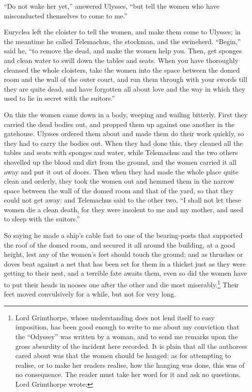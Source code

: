 “Do not wake her yet,” answered Ulysses, “but tell the women who have
misconducted themselves to come to me.”

Euryclea left the cloister to tell the women, and make them come to Ulysses; in
the meantime he called Telemachus, the stockman, and the swineherd. “Begin,”
said he, “to remove the dead, and make the women help you. Then, get sponges
and clean water to swill down the tables and seats. When you have thoroughly
cleansed the whole cloisters, take the women into the space between the domed
room and the wall of the outer court, and run them through with your swords
till they are quite dead, and have forgotten all about love and the way in
which they used to lie in secret with the suitors.”

On this the women came down in a body, weeping and wailing bitterly. First they
carried the dead bodies out, and propped them up against one another in the
gatehouse. Ulysses ordered them about and made them do their work quickly, so
they had to carry the bodies out. When they had done this, they cleaned all the
tables and seats with sponges and water, while Telemachus and the two others
shovelled up the blood and dirt from the ground, and the women carried it all
away and put it out of doors. Then when they had made the whole place quite
clean and orderly, they took the women out and hemmed them in the narrow space
between the wall of the domed room and that of the yard, so that they could not
get away: and Telemachus said to the other two, “I shall not let these women
die a clean death, for they were insolent to me and my mother, and used to
sleep with the suitors.”

So saying he made a ship’s cable fast to one of the bearing-posts that
supported the roof of the domed room, and secured it all around the building,
at a good height, lest any of the women’s feet should touch the ground; and as
thrushes or doves beat against a net that has been set for them in a thicket
just as they were getting to their nest, and a terrible fate awaits them, even
so did the women have to put their heads in nooses one after the other and die
most miserably.\footnote{Lord Grimthorpe, whose understanding does not lend itself to easy
imposition, has been good enough to write to me about my conviction that the
“Odyssey” was written by a woman, and to send me remarks upon the gross
absurdity of the incident here recorded. It is plain that all the authoress
cared about was that the women should be hanged: as for attempting to realise,
or to make her readers realise, how the hanging was done, this was of no
consequence. The reader must take her word for it and ask no questions. Lord
Grimthorpe wrote:} Their feet moved convulsively for a
while, but not for very long.

